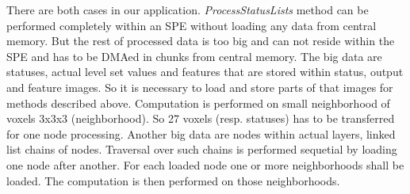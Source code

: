 \par
There are both cases in our application.
\emph{ProcessStatusLists} method can be performed completely within an SPE without loading any data from central memory.
But the rest of processed data is too big and can not reside within the SPE and has to be DMAed in chunks from central memory.
The big data are statuses, actual level set values and features that are stored within status, output and feature images.
So it is necessary to load and store parts of that images for methods described above.
Computation is performed on small neighborhood of voxels 3x3x3 (neighborhood).
So 27 voxels (resp. statuses) has to be transferred for one node processing.
Another big data are nodes within actual layers, linked list chains of nodes.
Traversal over such chains is performed sequetial by loading one node after another.
For each loaded node one or more neighborhoods shall be loaded.
The computation is then performed on those neighborhoods.

